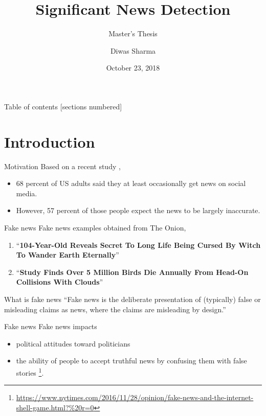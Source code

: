 \documentclass[12pt]{beamer}
\title{Significant News Detection}
\subtitle{Master's Thesis}
\date{October 23, 2018}
\author{Diwas Sharma}
\institute{The University of Alabama in Huntsville}
\begin{document}
\maketitle

\begin{frame}{Table of contents}
  [sections numbered]
  \tableofcontents[hideallsubsections]
\end{frame}

\section{Introduction}

\begin{frame}{Motivation}
    Based on a recent study \autocite{matsa2018news},
    \begin{itemize}
        \item 68 percent of US adults said they at least occasionally get news on social media.
        \item However, 57 percent of those people expect the news to be largely inaccurate.
    \end{itemize}
\end{frame}


\begin{frame}{Fake news}
    Fake news examples obtained from The Onion, \\
    \begin{enumerate}
        \item \enquote{\textbf{104-Year-Old Reveals Secret To Long Life Being Cursed By Witch To Wander Earth Eternally}} \\
        \item \enquote{\textbf{Study Finds Over 5 Million Birds Die Annually From Head-On Collisions With Clouds}} \\
    \end{enumerate}
\end{frame}

\begin{frame}{What is fake news}
    \enquote{Fake news is the deliberate presentation of (typically) false or misleading claims as news, where the claims are misleading by design.} \autocite{gelfert2018fake}
\end{frame}

\begin{frame}{Fake news }
    Fake news impacts \\
    \begin{itemize}
        \item political attitudes toward politicians \autocite{balmas2014fake}
        \item the ability of people to accept truthful news by confusing them with false stories \footnote{\url{https://www.nytimes.com/2016/11/28/opinion/fake-news-and-the-internet-shell-game.html?\%20r=0}}.
    \end{itemize}
\end{frame}
\end{document}
